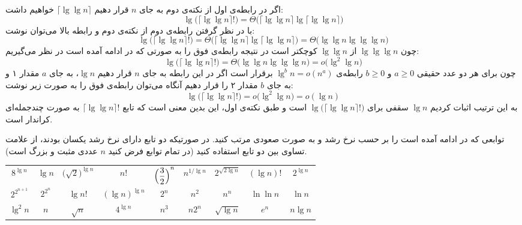 اگر در رابطه‌ی اول از نکته‌ی دوم به جای {$n$} قرار دهیم {$\lceil \lg \lg n \rceil$} خواهیم داشت:
\begin{displaymath}
 \lg \bigl(\lceil \lg \lg n \rceil !\bigr) = \Theta \bigl(\lceil \lg \lg n \rceil \lg \lceil \lg \lg n \rceil \bigr)
\end{displaymath}
با در نظر گرفتن رابطه‌ی دوم از نکته‌ی دوم و رابطه بالا می‌توان نوشت:
\begin{displaymath}
 \lg \bigl(\lceil \lg \lg n \rceil !\bigr) = \Theta \bigl(\lceil \lg \lg n \rceil \lg \lceil \lg \lg n \rceil \bigr) = \Theta \bigl(\lg \lg n \lg \lg \lg n \bigr)
\end{displaymath}
چون {$\lg \lg \lg n$} از {$\lg \lg n$} کوچکتر است در نتیجه رابطه‌ی فوق را به صورتی که در ادامه آمده است در نظر می‌گیریم:
\begin{displaymath}
 \lg \bigl(\lceil \lg \lg n \rceil !\bigr) = \Theta \bigl(\lg \lg n \lg \lg \lg n \bigr) = o\bigl( {\lg}^2 \lg n \bigr)
\end{displaymath}
چون برای هر دو عدد حقیقی {$a \geqslant 0$} و {$b \geqslant 0$} رابطه‌ی {${\lg}^bn=o(n^a)$} برقرار است اگر در این رابطه به جای {$n$} قرار دهیم {$\lg n$}، به جای {$a$} مقدار ۱ و به جای {$b$} مقدار ۲ را قرار دهیم آنگاه می‌توان رابطه‌ی فوق را به صورت زیر نوشت:
\begin{displaymath}
 \lg \bigl(\lceil \lg \lg n \rceil !\bigr) = o\bigl( {\lg}^2 \lg n \bigr) = o(\lg n)
\end{displaymath}
به این ترتیب اثبات کردیم {$\lg n$} سقفی برای {$\lg \bigl(\lceil \lg \lg n \rceil !\bigr)$} است و طبق نکته‌ی اول، این بدین معنی است که تابع {$\lceil \lg \lg n \rceil !$} به صورت چندجمله‌ای کراندار است.

 توابعی که در ادامه آمده است را بر حسب نرخ رشد و به صورت صعودی مرتب کنید. در صورتیکه دو تابع دارای نرخ رشد یکسان بودند، از علامت تساوی بین دو تابع استفاده کنید (در تمام توابع فرض کنید {$n$} عددی مثبت و بزرگ است).
\begin{center}
\begin{tabular}{ccccccccc}
$8^{\lg n}$ & $\lg n$ & ${\bigl(\sqrt{2}\bigr)}^{\lg n}$ & $n!$ & ${\Bigl( \dfrac{3}{2}\Bigr) }^n$ & $n^{1/\lg n}$ & $2^{\sqrt{2\lg n}}$ & $(\lg n)!$ & $2^{\lg n}$\\[0.4cm]
$2^{2^{n+1}}$ & $2^{2^{n}}$ & $\lg n!$ & ${(\lg n)}^{\lg n}$ & $2^n$ & $n^2$ & $n^n$ & $\ln \ln n$ & $\ln n$\\[0.4cm]
${\lg}^2 n$ & $n$ & $\sqrt{n}$ & $4^{\lg n}$ & $n^3$ & $n2^n$ & $\sqrt{\lg n}$ & $e^n$ & $n\lg n$
\end{tabular}
\end{center}

